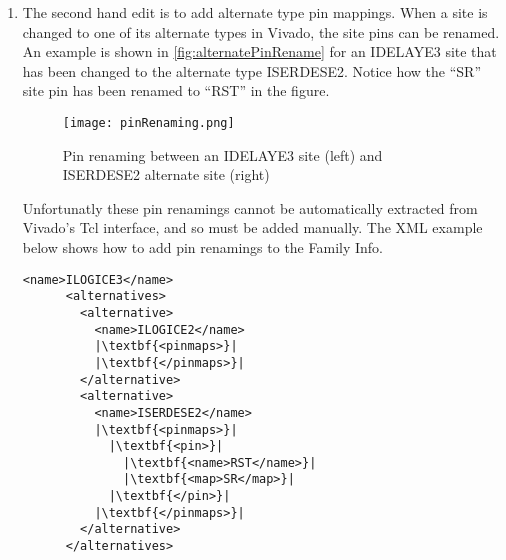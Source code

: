 \begin {enumerate}
\begin{enumerate}
      \noindent As the figure shows, there are no valid alternate types.
      The only way to determine invalid alternate types is to go site-by-site in
      the family info, select an instance of the site type in Vivado's device
      browser, and click the site type dropdown box (shown in the figure above).
      If there are any site types reported in the family info XML that are not
      shown in the GUI, they need to be removed from the XML. The following Tcl
      commands can be used to select a site in Vivado (after selecting a site,
      you may have to press F9 to view the site).
      
\begin{lstlisting}[numbers=none]
Vivado% start_gui
Vivado% set site [lindex [get_sites -filter {SITE_TYPE==IPAD}] 0]
Vivado% select $site
\end{lstlisting}
      
      \item  The second hand edit is to add alternate type pin mappings. When a
      site is changed to one of its alternate types in Vivado, the site pins can
      be renamed. An example is shown in \autoref{fig:alternatePinRename} for an
      IDELAYE3 site that has been changed to the alternate type ISERDESE2.
      Notice how the ``SR'' site pin has been renamed to ``RST'' in the figure.
      
      \begin{figure}[H]
        \centering
        \texttt{[image: pinRenaming.png]}
        \caption{Pin renaming between an IDELAYE3 site (left) and ISERDESE2
        alternate site (right)}
        \label{fig:alternatePinRename}
      \end{figure}
      
      Unfortunatly these pin renamings cannot be automatically extracted from
      Vivado's Tcl interface, and so must be added manually. The XML example
      below shows how to add pin renamings to the Family Info.

\begin{lstlisting}[numbers=none]
      <name>ILOGICE3</name>
      <alternatives>
        <alternative>
          <name>ILOGICE2</name>
          |\textbf{<pinmaps>}|
          |\textbf{</pinmaps>}|
        </alternative>
        <alternative>
          <name>ISERDESE2</name>
          |\textbf{<pinmaps>}|
	        |\textbf{<pin>}|
	          |\textbf{<name>RST</name>}|
	          |\textbf{<map>SR</map>}|
	        |\textbf{</pin>}|
          |\textbf{</pinmaps>}|
        </alternative>
      </alternatives>
\end{lstlisting}
      

\end{enumerate}
\end{enumerate}

